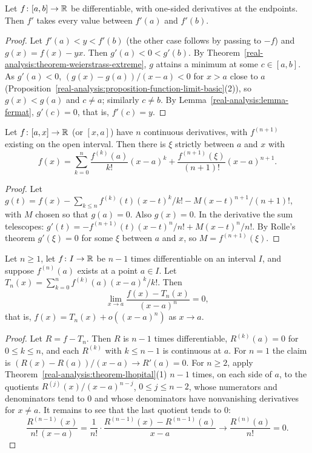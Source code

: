 \begin{theorem}[Darboux]\label{real-analysis:theorem-darboux}
Let $f \colon [a, b] \to \mathbb{R}$ be differentiable, with one-sided derivatives at the endpoints. Then $f'$ takes every value between $f'(a)$ and $f'(b)$.
\end{theorem}

\begin{proof}
Let $f'(a) < y < f'(b)$ (the other case follows by passing to $-f$) and $g(x) = f(x) - yx$. Then $g'(a) < 0 < g'(b)$. By Theorem~\ref{real-analysis:theorem-weierstrass-extreme}, $g$ attains a minimum at some
$c \in [a, b]$. As $g'(a) < 0$, $(g(x) - g(a))/(x - a) < 0$ for $x > a$ close to $a$ (Proposition~\ref{real-analysis:proposition-function-limit-basic}(2)), so $g(x) < g(a)$ and $c \neq a$; similarly $c \neq b$. By
Lemma~\ref{real-analysis:lemma-fermat}, $g'(c) = 0$, that is, $f'(c) = y$.
\end{proof}

\begin{theorem}[Taylor]\label{real-analysis:theorem-taylor-one}
Let $f \colon [a, x] \to \mathbb{R}$ (or $[x, a]$) have $n$ continuous derivatives, with $f^{(n+1)}$ existing on the open interval. Then there is $\xi$ strictly between $a$ and $x$ with
\[
f(x) = \sum_{k=0}^n\frac{f^{(k)}(a)}{k!}(x - a)^k + \frac{f^{(n+1)}(\xi)}{(n+1)!}(x - a)^{n+1}.
\]
\end{theorem}

\begin{proof}
Let $g(t) = f(x) - \sum_{k \leq n}f^{(k)}(t)(x - t)^k/k! - M(x - t)^{n+1}/(n+1)!$, with $M$ chosen so that $g(a) = 0$. Also $g(x) = 0$. In the derivative the sum telescopes:
$g'(t) = -f^{(n+1)}(t)(x - t)^n/n! + M(x - t)^n/n!$. By Rolle's theorem $g'(\xi) = 0$ for some $\xi$ between $a$ and $x$, so $M = f^{(n+1)}(\xi)$.
\end{proof}

\begin{proposition}\label{real-analysis:proposition-taylor-peano}
Let $n \geq 1$, let $f \colon I \to \mathbb{R}$ be $n - 1$ times differentiable on an interval $I$, and suppose $f^{(n)}(a)$ exists at a point $a \in I$. Let $T_n(x) = \sum_{k=0}^nf^{(k)}(a)(x - a)^k/k!$. Then
\[
\lim_{x \to a}\frac{f(x) - T_n(x)}{(x - a)^n} = 0,
\]
that is, $f(x) = T_n(x) + o((x - a)^n)$ as $x \to a$.
\end{proposition}

\begin{proof}
Let $R = f - T_n$. Then $R$ is $n - 1$ times differentiable, $R^{(k)}(a) = 0$ for $0 \leq k \leq n$, and each $R^{(k)}$ with $k \leq n - 1$ is continuous at $a$. For $n = 1$ the claim is
$(R(x) - R(a))/(x - a) \to R'(a) = 0$. For $n \geq 2$, apply Theorem~\ref{real-analysis:theorem-lhopital}(1) $n - 1$ times, on each side of $a$, to the quotients $R^{(j)}(x)/(x - a)^{n-j}$, $0 \leq j \leq n - 2$, whose
numerators and denominators tend to $0$ and whose denominators have nonvanishing derivatives for $x \neq a$. It remains to see that the last quotient tends to $0$:
\[
\frac{R^{(n-1)}(x)}{n!\,(x - a)} = \frac{1}{n!}\cdot\frac{R^{(n-1)}(x) - R^{(n-1)}(a)}{x - a} \longrightarrow \frac{R^{(n)}(a)}{n!} = 0.
\]
\end{proof}

